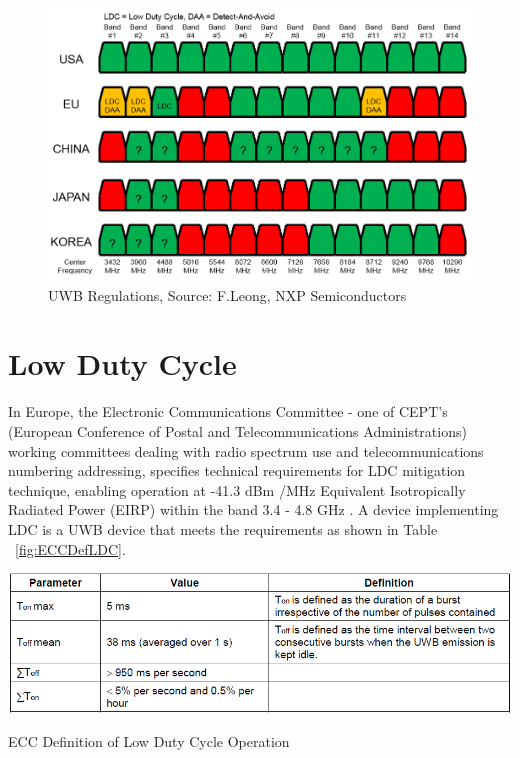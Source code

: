 \begin{figure}[htbp]
    \begin{center}
        \includegraphics[width=1\textwidth, scale=0.7]{figures/Picture1.png}
        \caption{UWB Regulations, Source: F.Leong, NXP Semiconductors}
        \label{fig:UWBRegulations}
    \end{center}
\end{figure}

\section{Low Duty Cycle}
In Europe, the Electronic Communications Committee - one of CEPT's (European Conference of Postal and Telecommunications
Administrations) working committees dealing with radio spectrum use and telecommunications numbering\/ addressing, specifies technical requirements for LDC mitigation technique, enabling operation at -41.3 dBm /MHz Equivalent Isotropically Radiated Power (EIRP) within the band 3.4 - 4.8 GHz \cite{ECCDecision}. A device implementing LDC is a UWB device that meets the requirements as shown in Table ~\ref{fig:ECCDefLDC}.

\begin{table}[htbp]
    \begin{center}
        \includegraphics[width=1\textwidth]{figures/Picture3.png}
        \caption[ECC Definition of Low Duty Cycle Operation]{ECC Definition of Low Duty Cycle Operation \protect\cite{ECCDecision}}
        \label{fig:ECCDefLDC}
    \end{center}
\end{table}

